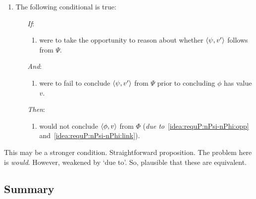 \begin{note}
\begin{definition}[A \requP{0}]
\begin{itemize}
      \begin{enumerate}[label=\arabic*., ref=\named{R:\arabic*}, resume]
      \item
        \label{idea:requP:nPsi-nPhi}
        The following conditional is true:
        \begin{enumerate}
        \item[\emph{If}:]
          \begin{enumerate}[label=\alph*., ref=\named{R:2\alph*}]
          \item
            \label{idea:requP:nPsi-nPhi:opp}
            \vAgent{} were to take the opportunity to reason about whether \(\langle \psi, v' \rangle\) follows from \(\Psi\).
          \end{enumerate}
        \item[\emph{And}:]
          \begin{enumerate}[label=\alph*., ref=\named{R:2\alph*}, resume]
          \item
            \label{idea:requP:nPsi-nPhi:link}
            \vAgent{} were to fail to conclude \(\langle \psi, v' \rangle\) from \(\Psi\) prior to concluding \(\phi\) has value \(v\).
          \end{enumerate}
        \item[\emph{Then}:]
          \begin{enumerate}[label=\alph*., ref=\named{R:2\alph*}, resume]
            \label{idea:requP:nPsi-nPhi:fail}
          \item
            \vAgent{} would not conclude \(\langle \phi, v \rangle\) from \(\Phi\) (\emph{due to}~\ref{idea:requP:nPsi-nPhi:opp} and~\ref{idea:requP:nPsi-nPhi:link}).
          \end{enumerate}
        \end{enumerate}
      \end{enumerate}
    \end{itemize}
    \vspace{-\baselineskip}
  \end{definition}
\end{note}

\begin{note}
  This may be a stronger condition.
  Straightforward proposition.
  The problem here is \emph{would}.
  However, weakened by `due to'.
  So, plausible that these are equivalent.
\end{note}

\subsection{Summary}
\label{cha:zS:sec:requs:summary}

